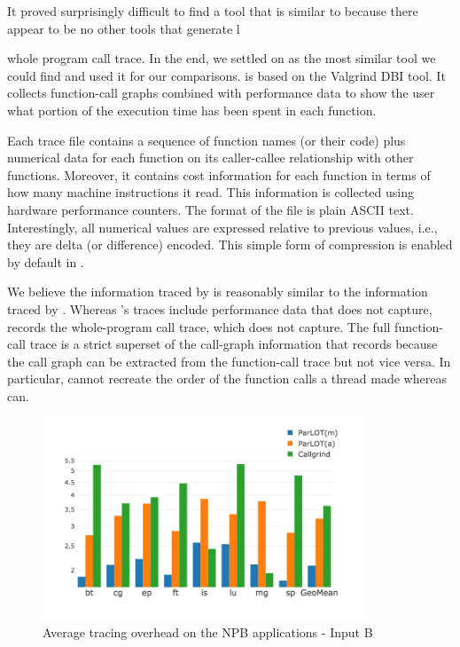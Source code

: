 It proved surprisingly difficult to find a tool that is similar to \parlot because there appear to be no other tools that generate l{whole program call trace.
%
In the end, we settled on \callgrind as the most similar tool we could find and used it for our comparisons.
%
\callgrind is based on the Valgrind DBI tool.
%
It collects function-call graphs combined with performance data to show the user what portion of the execution time has been spent in each function.




Each \callgrind trace file contains a sequence of function names (or their code) plus numerical data for each function on its caller-callee relationship with other functions.
%
Moreover, it contains cost information for each function in terms of how many machine instructions it read.
%
This information is collected using hardware performance counters.
%
The format of the file is plain ASCII text.
%
Interestingly, all numerical values are expressed relative to previous values, i.e., they are delta (or difference) encoded.
%
This simple form of compression is enabled by default in \callgrind.

We believe the information traced by \callgrind is reasonably similar to the information traced by \parlotm.
%
Whereas \callgrind 's traces include performance data that \parlot does not capture, \parlot records the whole-program call trace, which \callgrind does not capture.
%
The full function-call trace is a strict superset of the call-graph information that \callgrind records because the call graph can be extracted from the function-call trace but not vice versa.
%
In particular, \callgrind cannot recreate the order of the function calls a thread made whereas \parlot can.

\begin{figure}[t]
\centering
\includegraphics[width=3.8in]{figs.comet.newMed/comet_chartAvg_sd_B_p3_5.png}
\caption{Average tracing overhead on the NPB applications - Input B}
\label{comet_chartAvg_sd_B_p3_5}
\end{figure}

}
